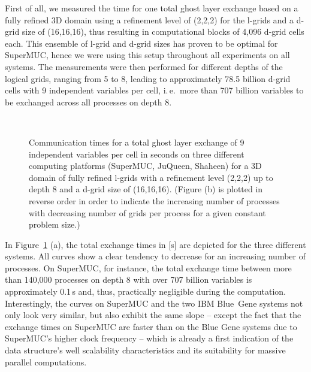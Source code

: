 \documentclass[10pt, conference, compsocconf]{IEEEtran}
\begin{document}
First of all, we measured the time for one total ghost layer exchange based on a fully refined 3D domain using a refinement level of (2,2,2) for the l-grids and a d-grid size of (16,16,16), thus resulting in computational blocks of 4,096 d-grid cells each. This ensemble of l-grid and d-grid sizes has proven to be optimal for SuperMUC, hence we were using this setup throughout all experiments on all systems. The measurements were then performed for different depths of the logical grids, ranging from 5 to 8, leading to approximately 78.5 billion d-grid cells with 9 independent variables per cell, i.\,e.\ more than 707 billion variables to be exchanged across all processes on depth 8.

\begin{figure}[!htbp]
	\centering
	 \\
	\caption{Communication times for a total ghost layer exchange of 9 independent variables per cell in seconds on three different computing platforms (SuperMUC, JuQueen, Shaheen) for a 3D domain of fully refined l-grids with a refinement level (2,2,2) up to depth 8 and a d-grid size of (16,16,16). (Figure (b) is plotted in reverse order in order to indicate the increasing number of processes with decreasing number of grids per process for a given constant problem size.)}
	\label{fig:impl:ghost_layer_exchange_times}
\end{figure}

In Figure~\ref{fig:impl:ghost_layer_exchange_times} (a), the total exchange times in [s] are depicted for the three different systems. All curves show a clear tendency to decrease for an increasing number of processes. On SuperMUC, for instance, the total exchange time between more than 140,000 processes on depth 8 with over 707 billion variables is approximately 0.1\,s and, thus, practically negligible during the computation. Interestingly, the curves on SuperMUC and the two IBM Blue~Gene systems not only look very similar, but also exhibit the same slope -- except the fact that the exchange times on SuperMUC are faster than on the Blue Gene systems due to SuperMUC's higher clock frequency -- which is already a first indication of the data structure's well scalability characteristics and its suitability for massive parallel computations.
\end{document}
